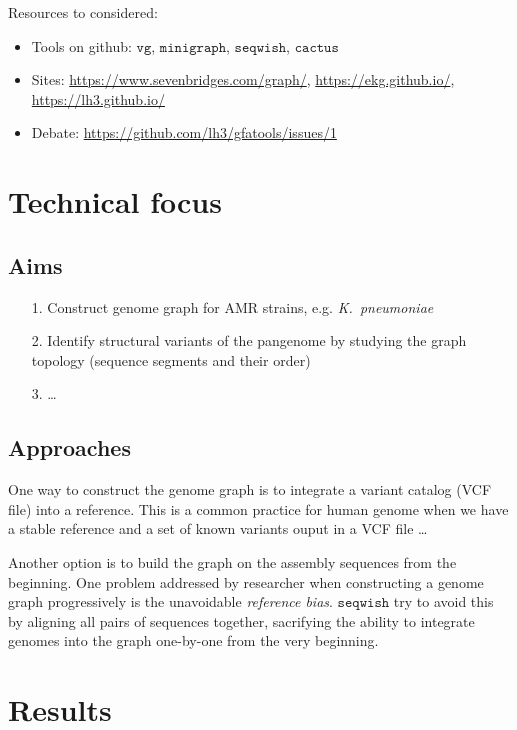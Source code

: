 \documentclass[10pt,twocolumn,twoside]{genpaper}
\newcommand{\vg}{$\mathtt{vg}$}
\newcommand{\mg}{$\mathtt{minigraph}$}
\newcommand{\sw}{$\mathtt{seqwish}$}
\newcommand{\kp}{\emph{K.~pneumoniae}}
\begin{document}
Resources to considered:
\begin{itemize}
\item Tools on github: \vg{}, \mg{}, \sw{}, $\mathtt{cactus}$
\item Sites: \url{https://www.sevenbridges.com/graph/}, \url{https://ekg.github.io/}, \url{https://lh3.github.io/}
\item Debate: \url{https://github.com/lh3/gfatools/issues/1}
\end{itemize}
\section*{Technical focus}
\subsection*{Aims}
\begin{itemize}
\item[1.] Construct genome graph for AMR strains, e.g. \kp{}
\item[2.] Identify structural variants of the pangenome by studying the graph topology (sequence segments and their order)  
\item[3.] \ldots
\end{itemize}
\subsection*{Approaches}
One way to construct the genome graph is to integrate a variant catalog (VCF file) into a reference. This is a common practice for human genome when we have a stable reference and a set of known variants ouput in a VCF file \ldots

Another option is to build the graph on the assembly sequences from the beginning.
One problem addressed by researcher when constructing a genome graph progressively is the unavoidable \emph{reference bias}.
\sw{} try to avoid this by aligning all pairs of sequences together, sacrifying the ability to integrate genomes into the graph one-by-one from the very beginning.


\section*{Results}


 
\end{document}

